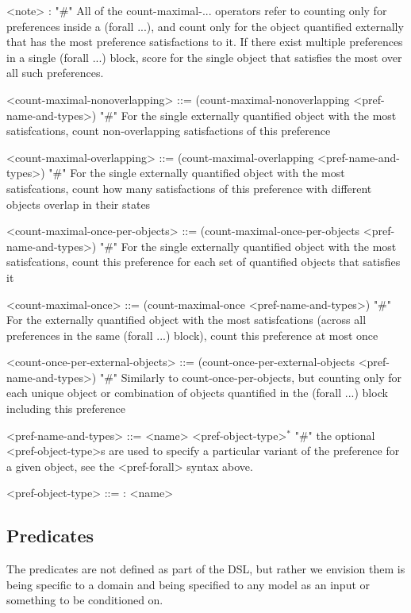 \documentclass{article}
\begin{document}
\begin{grammar}
<note> : "#" All of the count-maximal-... operators refer to counting only for preferences inside a (forall ...), and count only for the object quantified externally that has the most preference satisfactions to it. If there exist multiple preferences in a single (forall ...) block, score for the single object that satisfies the most over all such preferences.

<count-maximal-nonoverlapping> ::= (count-maximal-nonoverlapping <pref-name-and-types>) "#" For the single externally quantified object with the most satisfcations, count non-overlapping satisfactions of this preference

{ \color{teal} <count-maximal-overlapping> ::= (count-maximal-overlapping <pref-name-and-types>) "#" For the single externally quantified object with the most satisfcations, count how many satisfactions of this preference with different objects overlap in their states }

<count-maximal-once-per-objects> ::= (count-maximal-once-per-objects <pref-name-and-types>) "#" For the single externally quantified object with the most satisfcations, count this preference for each set of quantified objects that satisfies it

<count-maximal-once> ::= (count-maximal-once <pref-name-and-types>) "#" For the externally quantified object with the most satisfcations (across all preferences in the same (forall ...) block), count this preference at most once

{ \color{teal} <count-once-per-external-objects> ::=  (count-once-per-external-objects <pref-name-and-types>) "#" Similarly to count-once-per-objects, but counting only for each unique object or combination of objects quantified in the (forall ...) block including this preference }

<pref-name-and-types> ::= <name> <pref-object-type>$^*$ "#" the optional <pref-object-type>s are used to specify a particular variant of the preference for a given object, see the <pref-forall> syntax above.

    <pref-object-type> ::= : <name>




\end{grammar}



\subsection{Predicates}
The predicates are not defined as part of the DSL, but rather we envision them is being specific to a domain and being specified to any model as an input or something to be conditioned on. \\
\end{document}

